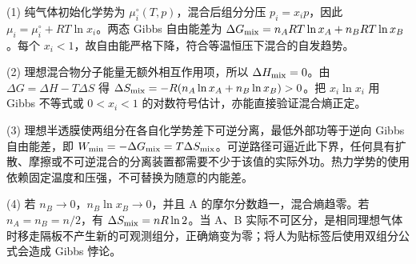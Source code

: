 (1) 纯气体初始化学势为 \(\mu_i^\circ(T,p)\)，混合后组分分压 \(p_i=x_ip\)，因此 \(\mu_i=\mu_i^\circ+RT\ln x_i\)。两态 Gibbs 自由能差为 \(\Delta G_{\rm mix}=n_ART\ln x_A+n_BRT\ln x_B\)。每个 \(x_i<1\)，故自由能严格下降，符合等温恒压下混合的自发趋势。

(2) 理想混合物分子能量无额外相互作用项，所以 \(\Delta H_{\rm mix}=0\)。由 \(\Delta G=\Delta H-T\Delta S\) 得 \(\Delta S_{\rm mix}=-R(n_A\ln x_A+n_B\ln x_B)>0\)。把 \(x_i\ln x_i\) 用 Gibbs 不等式或 \(0<x_i<1\) 的对数符号估计，亦能直接验证混合熵正定。

(3) 理想半透膜使两组分在各自化学势差下可逆分离，最低外部功等于逆向 Gibbs 自由能差，即 \(W_{\min}=-\Delta G_{\rm mix}=T\Delta S_{\rm mix}\)。可逆路径可逼近此下界，任何具有扩散、摩擦或不可逆混合的分离装置都需要不少于该值的实际外功。热力学势的使用依赖固定温度和压强，不可替换为随意的内能差。

(4) 若 \(n_B\to0\)，\(n_B\ln x_B\to0\)，并且 A 的摩尔分数趋一，混合熵趋零。若 \(n_A=n_B=n/2\)，有 \(\Delta S_{\rm mix}=nR\ln2\)。当 A、B 实际不可区分，是相同理想气体时移走隔板不产生新的可观测组分，正确熵变为零；将人为贴标签后使用双组分公式会造成 Gibbs 悖论。
